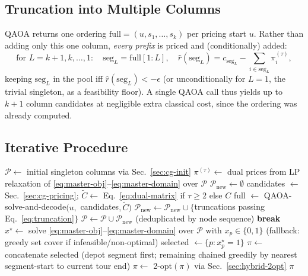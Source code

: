 \documentclass[11pt]{article}
\begin{document}
\subsection{Truncation into Multiple Columns}
\label{sec:cg-truncate}

QAOA returns one ordering $\mathrm{full} = (u, s_1,\dots,s_k)$ per pricing start $u$. Rather than adding only this one column, \emph{every prefix} is priced and (conditionally) added:
\begin{equation}
  \text{for } L = k{+}1, k, \dots, 1: \quad
  \mathrm{seg}_L = \mathrm{full}[1{:}L], \quad
  \hat r(\mathrm{seg}_L) = c_{\mathrm{seg}_L} - \sum_{i \in \mathrm{seg}_L} \pi^{(\tau)}_i,
  \label{eq:truncation}
\end{equation}
keeping $\mathrm{seg}_L$ in the pool iff $\hat r(\mathrm{seg}_L) < -\epsilon$ (or unconditionally for $L=1$, the trivial singleton, as a feasibility floor). A single QAOA call thus yields up to $k{+}1$ column candidates at negligible extra classical cost, since the ordering was already computed.

\subsection{Iterative Procedure}
\label{sec:cg-iterate}

\begin{algorithm}[H]
\caption{Column Generation with QAOA Pricing}
\begin{algorithmic}[1]
\State $\mathcal{P} \gets$ initial singleton columns via Sec.~\ref{sec:cg-init}
  \State $\pi^{(\tau)} \gets$ dual prices from LP relaxation of \eqref{eq:master-obj}--\eqref{eq:master-domain} over $\mathcal{P}$
  \State $\mathcal{P}_{\mathrm{new}} \gets \emptyset$
   
    \State candidates $\gets$ Sec.~\ref{sec:cg-pricing}; $\tilde C \gets$ Eq.~\eqref{eq:dual-matrix} if $\tau \ge 2$ else $C$
    \State full $\gets$ QAOA-solve-and-decode$(u,$ candidates$, \tilde C)$
    \State $\mathcal{P}_{\mathrm{new}} \gets \mathcal{P}_{\mathrm{new}} \cup \{$truncations passing Eq.~\eqref{eq:truncation}$\}$
  \EndFor
  \State $\mathcal{P} \gets \mathcal{P} \cup \mathcal{P}_{\mathrm{new}}$ (deduplicated by node sequence)
   \textbf{break} 
  \EndIf
\EndFor
\State $x^\star \gets$ solve \eqref{eq:master-obj}--\eqref{eq:master-domain} over $\mathcal{P}$ with $x_p \in \{0,1\}$ (fallback: greedy set cover if infeasible/non-optimal)
\State selected $\gets \{p : x_p^\star = 1\}$
\State $\pi \gets$ concatenate selected (depot segment first; remaining chained greedily by nearest segment-start to current tour end)
\State $\pi \gets$ 2-opt$(\pi)$ via Sec.~\ref{sec:hybrid-2opt}
\State \Return $\pi$
\end{algorithmic}
\end{algorithm}
\end{document}
